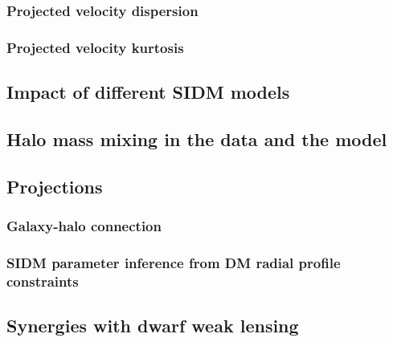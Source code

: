   \subsubsection{Projected velocity dispersion}
  
  \subsubsection{Projected velocity kurtosis}

\subsection{Impact of different SIDM models}

\subsection{Halo mass mixing in the data and the model}

\subsection{Projections}
  \subsubsection{Galaxy-halo connection}
  \subsubsection{SIDM parameter inference from DM radial profile constraints}

\subsection{Synergies with dwarf weak lensing}
